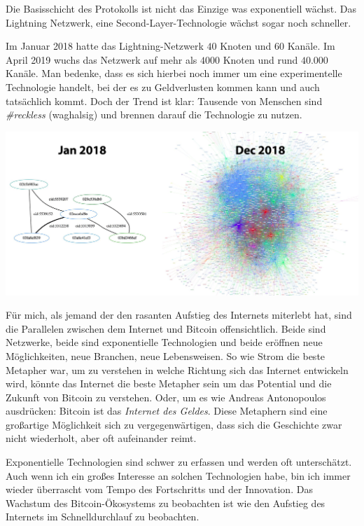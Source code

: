 Die Basisschicht des Protokolls ist nicht das Einzige was exponentiell wächst.
Das Lightning Netzwerk, eine Second-Layer-Technologie wächst sogar noch
schneller.

Im Januar 2018 hatte das Lightning-Netzwerk $40$ Knoten und $60$ Kanäle. Im
April 2019 wuchs das Netzwerk auf mehr als $4000$ Knoten und rund $40.000$
Kanäle. Man bedenke, dass es sich hierbei noch immer um eine experimentelle
Technologie handelt, bei der es zu Geldverlusten kommen kann und auch
tatsächlich kommt. Doch der Trend ist klar: Tausende von Menschen sind
\textit{\#reckless} (waghalsig) und brennen darauf die Technologie zu nutzen.

\begin{center}
  \includegraphics[width=\textwidth]{assets/images/lnd-growth-lopp-white.png}
  \label{fig:lnd-growth-lopp-white.png}
\end{center}

Für mich, als jemand der den rasanten Aufstieg des Internets miterlebt hat, sind
die Parallelen zwischen dem Internet und Bitcoin offensichtlich. Beide sind
Netzwerke, beide sind exponentielle Technologien und beide eröffnen neue
Möglichkeiten, neue Branchen, neue Lebensweisen. So wie Strom die beste Metapher
war, um zu verstehen in welche Richtung sich das Internet entwickeln wird,
könnte das Internet die beste Metapher sein um das Potential und die Zukunft von
Bitcoin zu verstehen. Oder, um es wie Andreas Antonopoulos ausdrücken: Bitcoin
ist das \textit{Internet des Geldes}. Diese Metaphern sind eine großartige
Möglichkeit sich zu vergegenwärtigen, dass sich die Geschichte zwar nicht
wiederholt, aber oft aufeinander reimt.

Exponentielle Technologien sind schwer zu erfassen und werden oft unterschätzt.
Auch wenn ich ein großes Interesse an solchen Technologien habe, bin ich immer
wieder überrascht vom Tempo des Fortschritts und der Innovation. Das Wachstum
des Bitcoin-Ökosystems zu beobachten ist wie den Aufstieg des Internets im
Schnelldurchlauf zu beobachten.

